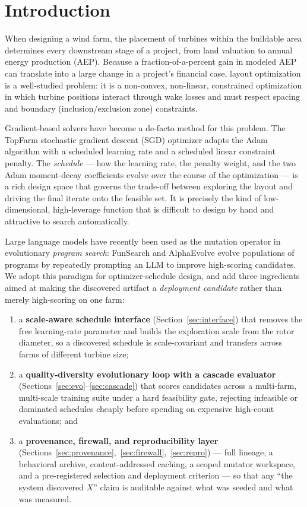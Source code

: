 \documentclass[11pt]{article}
\begin{document}
\section{Introduction}
\label{sec:intro}
When designing a wind farm, the placement of turbines within the buildable area
determines every downstream stage of a project, from land valuation to annual
energy production (AEP). Because a fraction-of-a-percent gain in modeled AEP can
translate into a large change in a project's financial case, layout optimization is
a well-studied problem: it is a non-convex, non-linear, constrained optimization in
which turbine positions interact through wake losses and must respect spacing and
boundary (inclusion/exclusion zone) constraints.

Gradient-based solvers have become a de-facto method for this problem. The TopFarm
stochastic gradient descent (SGD) optimizer \citep{quick2022sgd} adapts the Adam
algorithm \citep{kingma2015adam} with a scheduled learning rate and a scheduled
linear constraint penalty. The \emph{schedule} --- how the learning rate, the penalty
weight, and the two Adam moment-decay coefficients evolve over the course of the
optimization --- is a rich design space that governs the trade-off between exploring
the layout and driving the final iterate onto the feasible set. It is precisely the
kind of low-dimensional, high-leverage function that is difficult to design by hand
and attractive to search automatically.

Large language models have recently been used as the mutation operator in
evolutionary \emph{program search}: FunSearch \citep{fawzi2024funsearch} and
AlphaEvolve \citep{deepmind2025alphaevolve} evolve populations of programs by
repeatedly prompting an LLM to improve high-scoring candidates. We adopt this
paradigm for optimizer-schedule design, and add three ingredients aimed at making the
discovered artifact a \emph{deployment candidate} rather than merely high-scoring on one farm:

\begin{enumerate}
\itemsep0.15em
\item a \textbf{scale-aware schedule interface} (Section~\ref{sec:interface}) that
removes the free learning-rate parameter and builds the exploration scale from the
rotor diameter, so a discovered schedule is scale-covariant and transfers across
farms of different turbine size;
\item a \textbf{quality-diversity evolutionary loop with a cascade evaluator}
(Sections~\ref{sec:evo}--\ref{sec:cascade}) that scores candidates across a
multi-farm, multi-scale training suite under a hard feasibility gate, rejecting
infeasible or dominated schedules cheaply before spending on expensive high-count
evaluations; and
\item a \textbf{provenance, firewall, and reproducibility layer}
(Sections~\ref{sec:provenance},~\ref{sec:firewall},~\ref{sec:repro}) --- full lineage, a behavioral
archive, content-addressed caching, a scoped mutator workspace, and a pre-registered
selection and deployment criterion --- so that any ``the system discovered $X$''
claim is auditable against what was seeded and what was measured.
\end{enumerate}
\end{document}
